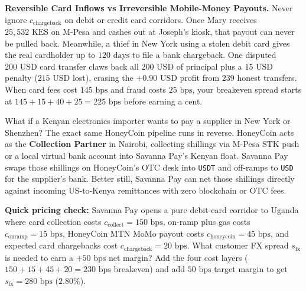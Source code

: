 \begin{trapbox}
\textbf{Reversible Card Inflows vs Irreversible Mobile-Money Payouts.} Never ignore $c_{\text{chargeback}}$ on debit or credit card corridors. Once Mary receives $25{,}532\text{ KES}$ on M-Pesa and cashes out at Joseph's kiosk, that payout can never be pulled back. Meanwhile, a thief in New York using a stolen debit card gives the real cardholder up to $120\text{ days}$ to file a bank chargeback. One disputed $200\text{ USD}$ card transfer claws back all $200\text{ USD}$ of principal plus a $15\text{ USD}$ penalty ($215\text{ USD}$ lost), erasing the $+0.90\text{ USD}$ profit from $239$ honest transfers. When card fees cost $145\text{ bps}$ and fraud costs $25\text{ bps}$, your breakeven spread starts at $145 + 15 + 40 + 25 = 225\text{ bps}$ before earning a cent.
\end{trapbox}

\begin{intuitionbox}
What if a Kenyan electronics importer wants to pay a supplier in New York or Shenzhen? The exact same HoneyCoin pipeline runs in reverse. HoneyCoin acts as the \textbf{Collection Partner} in Nairobi, collecting shillings via M-Pesa STK push or a local virtual bank account into Savanna Pay's Kenyan float. Savanna Pay swaps those shillings on HoneyCoin's OTC desk into \texttt{USDT} and off-ramps to \texttt{USD} for the supplier's bank. Better still, Savanna Pay can net those shillings directly against incoming US-to-Kenya remittances with zero blockchain or OTC fees.
\end{intuitionbox}

\begin{walkbox}
\textbf{Quick pricing check:} Savanna Pay opens a pure debit-card corridor to Uganda where card collection costs $c_{\text{collect}} = 150\text{ bps}$, on-ramp plus gas costs $c_{\text{onramp}} = 15\text{ bps}$, HoneyCoin MTN MoMo payout costs $c_{\text{honeycoin}} = 45\text{ bps}$, and expected card chargebacks cost $c_{\text{chargeback}} = 20\text{ bps}$. What customer FX spread $s_{\text{fx}}$ is needed to earn a $+50\text{ bps}$ net margin? Add the four cost layers ($150 + 15 + 45 + 20 = 230\text{ bps}$ breakeven) and add $50\text{ bps}$ target margin to get $s_{\text{fx}} = 280\text{ bps}$ ($2.80\%$).
\end{walkbox}

